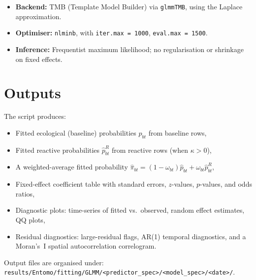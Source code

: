 \documentclass[12pt,a4paper]{article}
\begin{document}
\begin{itemize}
  \item \textbf{Backend:} TMB (Template Model Builder) via \texttt{glmmTMB}, using the Laplace approximation.
  \item \textbf{Optimiser:} \texttt{nlminb}, with \texttt{iter.max = 1000}, \texttt{eval.max = 1500}.
  \item \textbf{Inference:} Frequentist maximum likelihood; no regularisation or shrinkage on fixed effects.
\end{itemize}

\section{Outputs}

The script produces:
\begin{itemize}
  \item Fitted ecological (baseline) probabilities $\hat{p}_{bt}$ from baseline rows,
  \item Fitted reactive probabilities $\hat{p}_{bt}^R$ from reactive rows (when $\kappa > 0$),
  \item A weighted-average fitted probability $\hat{\pi}_{bt} = (1-\omega_{bt})\hat{p}_{bt} + \omega_{bt}\hat{p}_{bt}^R$,
  \item Fixed-effect coefficient table with standard errors, $z$-values, $p$-values, and odds ratios,
  \item Diagnostic plots: time-series of fitted vs.\ observed, random effect estimates, QQ plots,
  \item Residual diagnostics: large-residual flags, AR(1) temporal diagnostics, and a Moran's~I spatial autocorrelation correlogram.
\end{itemize}

Output files are organised under:
\texttt{results/Entomo/fitting/GLMM/<predictor\_spec>/<model\_spec>/<date>/}.
\end{document}
